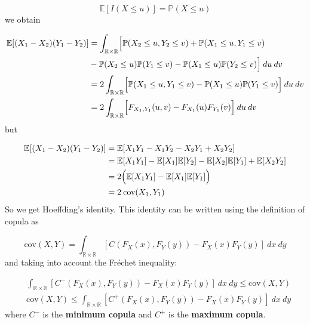 \documentclass{article}
\begin{document}
\begin{equation}
    \mathbb{E} [I(X \le u)] = \mathbb{P} (X \le u)
\end{equation}
we obtain

\begin{equation}
    \begin{split}
        \mathbb{E}[(X_1 - X_2)(Y_1 - Y_2)] & = \int_{\mathbb{R}\times\mathbb{R}} \Bigl[
        \mathbb{P}(X_2\le u, Y_2\le v) + \mathbb{P}(X_1\le u, Y_1\le v) \\
        & - \mathbb{P}(X_2\le u) \mathbb{P}(Y_1\le v) - \mathbb{P}(X_1\le u) \mathbb{P}(Y_2\le v) 
        \Bigr] \>du\>dv \\
        & = 2 \int_{\mathbb{R}\times\mathbb{R}} \Bigl[
            \mathbb{P}(X_1\le u, Y_1\le v) - \mathbb{P}(X_1\le u) \mathbb{P}(Y_1\le v)
        \Bigr] \>du\>dv \\
        & =  2 \int_{\mathbb{R}\times\mathbb{R}} \Bigl[
            F_{X_1, Y_1}(u, v) - F_{X_1}(u)F_{Y_1}(v)
        \Bigr] \>du\>dv
    \end{split}
\end{equation}
but

\begin{equation}
    \begin{split}
        \mathbb{E}[(X_1 - X_2)(Y_1 - Y_2)] & = \mathbb{E}[X_1Y_1 - X_1Y_2 - X_2Y_1 + X_2Y_2]   \\
        & = \mathbb{E}[X_1Y_1] - \mathbb{E}[X_1]\mathbb{E}[Y_2] - \mathbb{E}[X_2]\mathbb{E}[Y_1] + \mathbb{E}[X_2Y_2] \\
        & = 2\Bigl( \mathbb{E}[X_1Y_1] - \mathbb{E}[X_1]\mathbb{E}[Y_1] \Bigr) \\
        & = 2 \> \text{cov}(X_1,Y_1)
    \end{split}
\end{equation}
So we get Hoeffding's identity. This identity can be written using the definition of copula as

\begin{equation}
\text{cov}(X,Y)=\int_{\mathbb{R}\times\mathbb{R}}[C(F_X(x), F_Y(y))-F_X(x) F_Y(y)]\>dx\>dy 
\end{equation}
and taking into account the Fréchet inequality:

\begin{equation}
    \begin{split}
        & \int_{\mathbb{R}\times\mathbb{R}}[C^-(F_X(x), F_Y(y))-F_X(x) F_Y(y)]\>dx\>dy \le \text{cov}(X,Y) \\
        & \text{cov}(X,Y) \le \int_{\mathbb{R}\times\mathbb{R}}[C^+(F_X(x), F_Y(y))-F_X(x) F_Y(y)]\>dx\>dy 
    \end{split}
\end{equation}
where $C^-$ is the \textbf{minimum copula} and $C^+$ is the \textbf{maximum copula}. 
%
%
\end{document}
